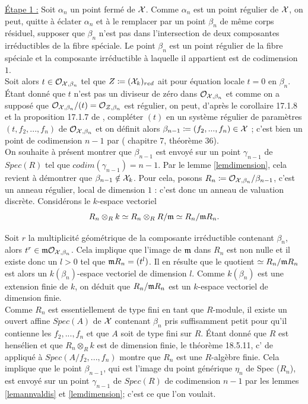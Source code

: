\documentclass[11pt]{article}
\begin{document}
\underline{Étape 1 :} Soit $\alpha_n$ un point fermé de $\mathcal{X}$.  Comme $\alpha_{n}$ est un point régulier de $\mathcal{X}$, on peut, quitte à éclater $\alpha_{n}$ et à le remplacer par un point $\beta_{n}$ de même corps résiduel, supposer que $\beta_{n}$ n'est pas dans l'intersection de deux composantes irréductibles de la fibre spéciale. Le point $\beta_{n}$ est un point régulier de la fibre spéciale et la composante irréductible à laquelle il appartient est de codimension $1$.\\
Soit alors $t \in \mathcal{O}_{\mathcal{X},\beta_{n}}$ tel que $Z \coloneqq (\CX_k)_{red}$ ait pour équation locale $t=0$ en $\beta_n$. Étant donné que $t$ n’est pas un diviseur de zéro dans $\mathcal{O}_{\mathcal{X},\beta_n}$ et comme on a supposé que $\mathcal{O}_{\mathcal{X},\beta_n} / (t) = \mathcal{O}_{\mathcal{Z}, \beta_n}$ est régulier, on peut, d'après le corollaire 17.1.8 et la  proposition 17.1.7 de \cite{PMIHES_1964__20__5_0}, compléter $(t)$ en un système régulier de paramètres $(t,f_2,...,f_n)$ de $\mathcal{O}_{\mathcal{X},\beta_n}$ et on définit alors $\beta_{n-1} \coloneqq (f_2,...,f_n) \in \CX$ ; c'est bien un point de codimension $n-1$ par (\cite{Matsumura} chapitre 7, théorème 36).\\

On souhaite à présent montrer que $\beta_{n-1}$ est envoyé sur un point $\gamma_{n-1}$ de $Spec(R)$ tel que $codim(\gamma_{n-1}) = n-1$. Par le lemme \ref{lemdimension}, cela revient à démontrer que $\beta_{n-1} \notin \mathcal{X}_k$. Pour cela, posons $R_n \coloneqq \CO_{\CX,\beta_n}/\beta_{n-1}$, c'est un anneau régulier, local de dimension $1$ : c'est donc un anneau de valuation discrète. Considérons le $k$-espace vectoriel
$$R_n \otimes_R k
 \simeq R_n \otimes_R R/\mathfrak{m} \simeq R_n/\mathfrak{m} R_n .$$ 


Soit $r$ la multiplicité géométrique de la composante irréductible contenant $\beta_n$, alors $ t^r  \in \mathfrak{m} \mathcal{O}_{\mathcal{X},\beta_n}$. Cela implique que l'image de $\mathfrak{m}$ dans $R_n$ est non nulle et il existe donc un $l>0$ tel que $\mathfrak{m} R_n = (t^l)$. Il en résulte que le quotient $\simeq R_n/\mathfrak{m} R_n $ est alors un $k(\beta_n)$-espace vectoriel de dimension $l$. Comme $k(\beta_n)$ est une extension finie de $k$, on déduit que $R_n/\mathfrak{m} R_n $ est un $k$-espace vectoriel de dimension finie.\\


Comme $R_n$ est essentiellement de type fini en tant que $R$-module, il existe un ouvert affine $Spec(A)$ de $\mathcal{X}$ contenant $\beta_{n}$ pris suffisamment petit pour qu'il contienne les $f_2,...,f_n$ et que $A$ soit de type fini sur $R$. Étant donné que $R$ est hensélien et que $R_n \otimes_R k$ est de dimension finie, le théorème 18.5.11, c' de \cite{PMIHES_1967__32__5_0}  appliqué à $Spec(A/f_2,...,f_n)$ montre que $R_n$ est une $R$-algèbre finie. Cela implique
que le point $\beta_{n-1}$, qui est l'image du point générique $\eta_n$ de Spec ($R_n$), est envoyé sur un point $\gamma_{n-1}$ de $Spec(R)$ de codimension $n-1$ par les lemmes \ref{lemannvaldis} et \ref{lemdimension}; c'est ce que l'on voulait.\\
\end{document}
